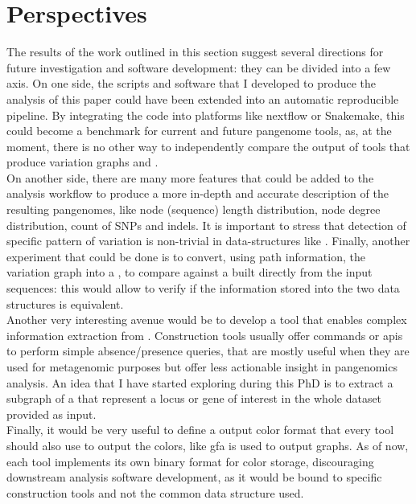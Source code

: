 \section{Perspectives}
The results of the work outlined in this section suggest several directions for future investigation and software development: they can be divided into a few axis.
On one side, the scripts and software that I developed to produce the analysis of this paper could have been extended into an automatic reproducible pipeline. By integrating the code into platforms like nextflow or Snakemake, this could become a benchmark for current and future pangenome tools, as, at the moment, there is no other way to independently compare the output of tools that produce variation graphs and \dbgs. \\
On another side, there are many more features that could be added to the analysis workflow to produce a more in-depth and accurate description of the resulting pangenomes, like node (sequence) length distribution, node degree distribution, count of SNPs and indels. It is important to stress that detection of specific pattern of variation is non-trivial in data-structures like \dbgs. Finally, another experiment that could be done is to convert, using path information, the variation graph into a \ccdbg, to compare against a \ccdbg built directly from the input sequences: this would allow to verify if the information stored into the two data structures is equivalent. \\
Another very interesting avenue would be to develop a tool that enables complex information extraction from \ccdbgs. Construction tools usually offer commands or apis to perform simple absence/presence queries, that are mostly useful when they are used for metagenomic purposes but offer less actionable insight in pangenomics analysis. An idea that I have started exploring during this PhD is to extract a subgraph of a \ccdbg that represent a locus or gene of interest in the whole dataset provided as input. \\ 
Finally, it would be very useful to define a \ccdbg output color format that every tool should also use to output the colors, like gfa is used to output graphs. As of now, each tool implements its own binary format for color storage, discouraging downstream analysis software development, as it would be bound to specific construction tools and not the common data structure used.

\newpage

